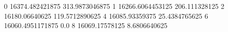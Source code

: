 0 16374.482421875 313.9873046875
1 16266.6064453125 206.111328125
2 16180.06640625 119.5712890625
4 16085.93359375 25.4384765625
6 16060.4951171875 0.0
8 16069.17578125 8.6806640625
